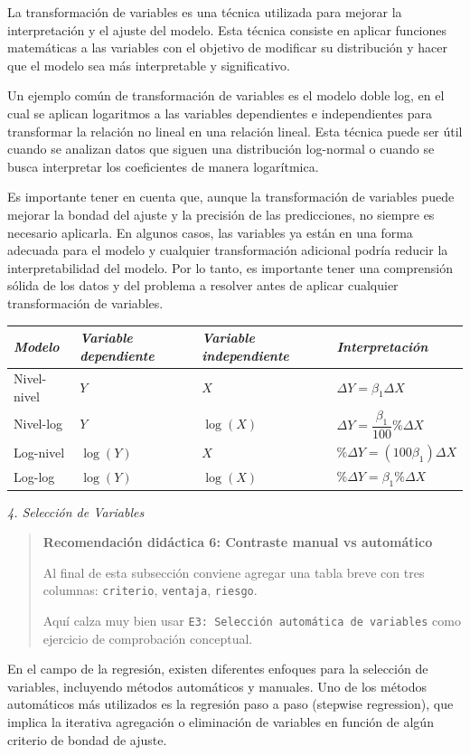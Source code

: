 \documentclass[
]{book}
\begin{document}
La transformación de variables es una técnica utilizada para mejorar la
interpretación y el ajuste del modelo. Esta técnica consiste en aplicar
funciones matemáticas a las variables con el objetivo de modificar su
distribución y hacer que el modelo sea más interpretable y
significativo.

Un ejemplo común de transformación de variables es el modelo doble log,
en el cual se aplican logaritmos a las variables dependientes e
independientes para transformar la relación no lineal en una relación
lineal. Esta técnica puede ser útil cuando se analizan datos que siguen
una distribución log-normal o cuando se busca interpretar los
coeficientes de manera logarítmica.

Es importante tener en cuenta que, aunque la transformación de variables
puede mejorar la bondad del ajuste y la precisión de las predicciones,
no siempre es necesario aplicarla. En algunos casos, las variables ya
están en una forma adecuada para el modelo y cualquier transformación
adicional podría reducir la interpretabilidad del modelo. Por lo tanto,
es importante tener una comprensión sólida de los datos y del problema a
resolver antes de aplicar cualquier transformación de variables.

\begin{longtable}[]{@{}llll@{}}
\toprule
\emph{Modelo} & \emph{Variable dependiente} & \emph{Variable independiente} & \emph{Interpretación}\tabularnewline
\midrule
\endhead
Nivel-nivel & \(Y\) & \(X\) & \(\Delta Y = \beta_1 \Delta X\)\tabularnewline
Nivel-log & \(Y\) & \(\log(X)\) & \(\Delta Y = \dfrac{\beta_1}{100}\% \Delta X\)\tabularnewline
Log-nivel & \(\log(Y)\) & \(X\) & \(\%\Delta Y = (100\beta_1)\Delta X\)\tabularnewline
Log-log & \(\log(Y)\) & \(\log(X)\) & \(\%\Delta Y = \beta_1 \%\Delta X\)\tabularnewline
\bottomrule
\end{longtable}

\emph{4. Selección de Variables}

\begin{quote}
\textbf{Recomendación didáctica 6: Contraste manual vs automático}

Al final de esta subsección conviene agregar una tabla breve con tres
columnas: \texttt{criterio}, \texttt{ventaja}, \texttt{riesgo}.

Aquí calza muy bien usar \texttt{E3:\ Selección\ automática\ de\ variables} como
ejercicio de comprobación conceptual.
\end{quote}

En el campo de la regresión, existen diferentes enfoques para la
selección de variables, incluyendo métodos automáticos y manuales. Uno
de los métodos automáticos más utilizados es la regresión paso a paso
(stepwise regression), que implica la iterativa agregación o eliminación
de variables en función de algún criterio de bondad de ajuste.
\end{document}
